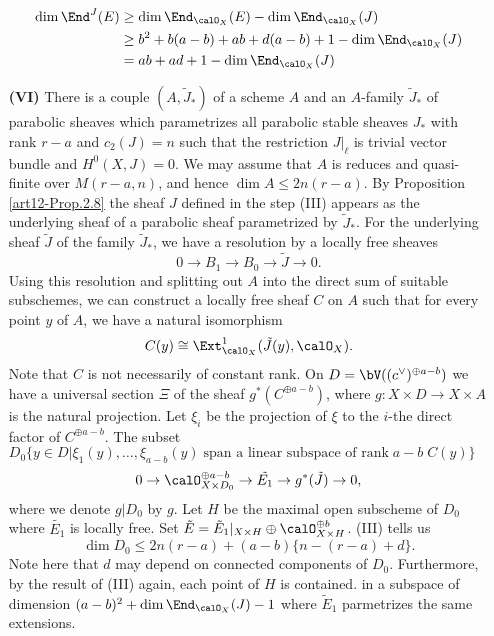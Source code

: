 \begin{itemize}
\begin{align*}
\dim \End^{J}(E) &\geq \dim \End_{\calO_{X}}(E)-\dim \End_{\calO_{X}}(J)\\
 &\geq b^{2} + b(a-b) + ab + d(a-b) + 1 -\dim \End_{\calO_{X}}(J)\\
 &= ab + ad + 1 - \dim\End_{\calO_{X}}(J)
\end{align*}

\item[\bf(VI)] There is a couple $(A, \tilde{J}_{*})$ of a scheme $A$ and an $A$-family $\tilde{J}_{*}$ of parabolic sheaves which parametrizes all parabolic stable sheaves $J_{*}$ with rank $r-a$ and $c_{2}(J)=n$ such that the restriction $J|_{\ell}$ is trivial vector bundle and $H^{0}(X, J)=0$. We may assume that $A$ is reduces and quasi-finite over $M(r-a, n)$, and hence $\dim A\leq 2n(r-a)$. By Proposition \ref{art12-Prop.2.8} the sheaf $J$ defined in the step (III) appears as the underlying sheaf of a parabolic sheaf parametrized by $\tilde{J}_{*}$. For the underlying sheaf $\tilde{J}$ of the family $\tilde{J}_{*}$, we have a resolution by a locally free sheaves
$$
0 \rightarrow B_{1} \rightarrow B_{0} \rightarrow \tilde{J} \rightarrow 0.
$$
Using this resolution and splitting out $A$ into the direct sum of suitable subschemes, we can construct a locally free sheaf $C$ on $A$ such that for every point $y$ of $A$,  we have a natural isomorphism
$$
C(y) \cong \Ext_{\calO_{X}}^{1} (\tilde{J}(y), \calO_{X}).
$$
Note that $C$ is not necessarily of constant rank. On $D=\break \bV( (c^{\vee})^{\oplus a-b})$ we have a universal section $\Xi$ of the sheaf $g^{*}(C^{\oplus a-b})$, where $g : X\times D \rightarrow X\times A$ is the natural projection. Let $\xi_{i}$ be the projection of $\xi$ to the $i$-the direct factor of $C^{\oplus a-b}$. The subset $D_{0}\{y \in D | \xi_{1}(y), \ldots, \xi_{a-b}(y)\; \text{span a linear subspace of rank}\; a-b\; C(y)\}$
$$
0 \rightarrow \calO_{X\times D_{0}}^{\oplus a-b} \rightarrow \tilde{E_{1}} \rightarrow g^{*} (\tilde{J})\rightarrow 0,
$$
where we denote $g |D_{0}$ by $g$. Let $H$ be the maximal open subscheme of $D_{0}$ where $\tilde{E_{1}}$ is locally free. Set $\tilde{E} = \tilde{E}_{1}|_{X\times H} \oplus \calO_{X \times H}^{\oplus b}$. (III) tells us
$$
\dim D_{0}\leq 2n(r-a) + (a-b) \{n-(r-a) + d\}.
$$
Note here that $d$ may depend on connected components of $D_{0}$. Furthermore, by the result of (III) again, each point of $H$ is contained. in a subspace of dimension $(a-b)^{2} + \dim \End_{\calO_{X}}(J)-1$ where $\tilde{E}_{1}$ parmetrizes the same extensions.


\end{itemize}
